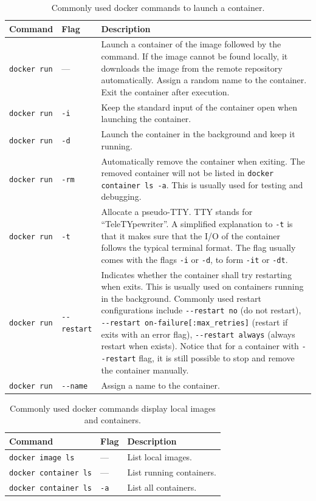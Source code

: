 \begin{table}
	\centering \caption{Commonly used docker commands to launch a container.}\label{ch:vac:tab:launchcontainer}
	\begin{tabularx}{\textwidth}{llX}
		\hline
		Command & Flag & Description \\ \hline
		\verb|docker run| & --- & Launch a container of the image followed by the command. If the image cannot be found locally, it downloads the image from the remote repository automatically. Assign a random name to the container. Exit the container after execution. \\ \hdashline
        \verb|docker run| & \verb|-i| & Keep the standard input of the container open when launching the container. \\ \hdashline
        \verb|docker run| & \verb|-d| & Launch the container in the background and keep it running. \\ \hdashline
        \verb|docker run| & \verb|-rm| & Automatically remove the container when exiting. The removed container will not be listed in \verb|docker container ls -a|. This is usually used for testing and debugging. \\ \hdashline
        \verb|docker run| & \verb|-t| & Allocate a pseudo-TTY. TTY stands for ``TeleTYpewriter''. A simplified explanation to \verb|-t| is that it makes sure that the I/O of the container follows the typical terminal format. The flag usually comes with the flags \verb|-i| or \verb|-d|, to form \verb|-it| or \verb|-dt|. \\ \hdashline
        \verb|docker run| & \verb|--restart| & Indicates whether the container shall try restarting when exits. This is usually used on containers running in the background. Commonly used restart configurations include \verb|--restart no| (do not restart), \verb|--restart on-failure[:max_retries]| (restart if exits with an error flag), \verb|--restart always| (always restart when exists). Notice that for a container with \verb|--restart| flag, it is still possible to stop and remove the container manually. \\ \hdashline
        \verb|docker run| & \verb|--name| & Assign a name to the container. \\
		\hline
	\end{tabularx}
\end{table}

\begin{table}
	\centering \caption{Commonly used docker commands display local images and containers.}\label{ch:vac:tab:listcontainer}
	\begin{tabularx}{\textwidth}{llX}
		\hline
		Command & Flag & Description \\ \hline
        \verb|docker image ls| & --- & List local images. \\ \hdashline
        \verb|docker container ls| & --- & List running containers. \\ \hdashline
        \verb|docker container ls| & \verb|-a| & List all containers. \\
		\hline
	\end{tabularx}
\end{table}

